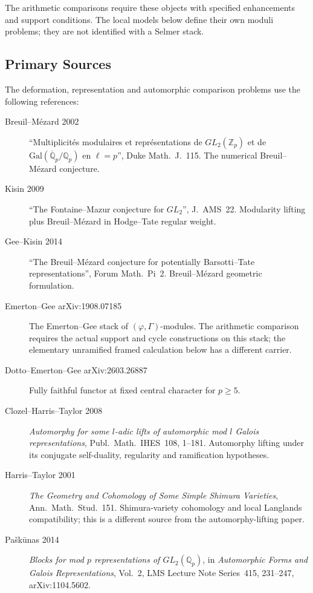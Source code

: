 The arithmetic comparisons require these objects with specified enhancements and support conditions. The local models below define their own moduli problems; they are not identified with a Selmer stack.

\subsection{Primary Sources}
\label{v4-arith:w5-e:sources}

The deformation, representation and automorphic comparison problems use the following references:
\begin{description}
\item[Breuil--M{\'e}zard 2002] ``Multiplicit{\'e}s modulaires et
repr{\'e}sentations de \(GL_{2}(\mathbb{Z}_{p})\) et de
\(\mathrm{Gal}(\overline{\mathbb{Q}}_{p}/\mathbb{Q}_{p})\) en
\(\ell = p\)'', Duke Math.~J.~115. The numerical Breuil--M{\'e}zard
conjecture.
\item[Kisin 2009] ``The Fontaine--Mazur conjecture for \(GL_{2}\)'',
J.~AMS~22. Modularity lifting plus Breuil--M{\'e}zard in
Hodge--Tate regular weight.
\item[Gee--Kisin 2014] ``The Breuil--M{\'e}zard conjecture for
potentially Barsotti--Tate representations'', Forum Math.~Pi~2.
Breuil--M{\'e}zard geometric formulation.
\item[Emerton--Gee arXiv:1908.07185] The Emerton--Gee stack of
\((\varphi,\Gamma)\)-modules. The arithmetic comparison requires the
actual support and cycle constructions on this stack; the elementary
unramified framed calculation below has a different carrier.
\item[Dotto--Emerton--Gee arXiv:2603.26887] Fully faithful functor at
fixed central character for \(p\geq 5\).
\item[Clozel--Harris--Taylor 2008]
\emph{Automorphy for some $l$-adic lifts of automorphic mod $l$ Galois
representations}, Publ.\ Math.\ IHES~108, 1--181. Automorphy lifting
under its conjugate self-duality, regularity and ramification hypotheses.
\item[Harris--Taylor 2001]
\emph{The Geometry and Cohomology of Some Simple Shimura Varieties},
Ann.\ Math.\ Stud.~151. Shimura-variety cohomology and local Langlands
compatibility; this is a different source from the automorphy-lifting paper.
\item[Pa\v{s}k\=unas 2014]
\emph{Blocks for mod $p$ representations of $GL_2(\mathbb Q_p)$},
in \emph{Automorphic Forms and Galois Representations}, Vol.~2,
LMS Lecture Note Series~415, 231--247, arXiv:1104.5602.

\end{description}

